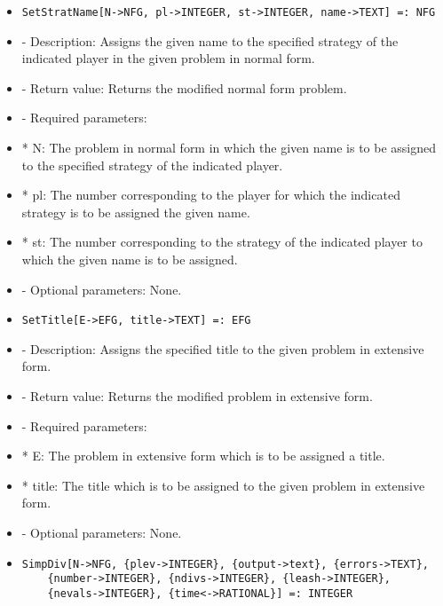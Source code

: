 \begin{itemize}
\item

\begin{verbatim}
SetStratName[N->NFG, pl->INTEGER, st->INTEGER, name->TEXT] =: NFG
\end{verbatim}

\bd
\item
- Description:  Assigns the given name to the specified strategy of the
indicated player in the given problem in normal form.
\item
- Return value:  Returns the modified normal form problem.
\item
- Required parameters:
	
\bd
\item
*  N:  The problem in normal form in which the given name is to be
assigned to the specified strategy of the indicated player.
\item
*  pl:  The number corresponding to the player for which the 
indicated strategy is to be assigned the given name.
\item
*  st:  The number corresponding to the strategy of the indicated 
player to which the given name is to be assigned.
\ed

\item
- Optional parameters:  None.

\ed

\item

\begin{verbatim}
SetTitle[E->EFG, title->TEXT] =: EFG
\end{verbatim}

\bd
\item
- Description:  Assigns the specified title to the given problem in 
extensive form.
\item
- Return value:  Returns the modified problem in extensive form.
\item
- Required parameters:
	
\bd
\item
*  E:  The problem in extensive form which is to be assigned a title.
\item
*  title:  The title which is to be assigned to the given problem in 
extensive form.
\ed

\item
- Optional parameters:  None.
\ed

\item
\begin{verbatim}
SimpDiv[N->NFG, {plev->INTEGER}, {output->text}, {errors->TEXT},
	{number->INTEGER}, {ndivs->INTEGER}, {leash->INTEGER}, 
	{nevals->INTEGER}, {time<->RATIONAL}] =: INTEGER
\end{verbatim}


\end{itemize}
